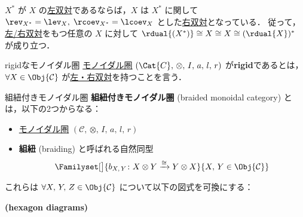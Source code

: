 \documentclass[TQFT_main]{subfiles}
\begin{document}
\begin{marker}
    $X^*$ が $X$ の\hyperref[def:dual]{左双対}であるならば，$X$ は $X^*$ に関して $\rev_{X^*} = \lev_{X},\; \rcoev_{X^*} = \lcoev_{X}$ とした\hyperref[def:dual]{右双対}となっている．
    従って，\hyperref[def:dual]{左/右双対}をもつ任意の $X$ に対して $\rdual{(X^*)} \cong X \cong X \cong (\rdual{X})^*$ が成り立つ．
\end{marker}

\begin{mydef}[label=redef:rigid]{rigidなモノイダル圏}
    \hyperref[def:monoidal-category]{モノイダル圏} $(\Cat{C},\, \otimes,\, I,\, a,\, l,\, r)$ が\textbf{rigid}であるとは，$\forall X \in \Obj{\mathcal{C}}$ が\hyperref[redef:dual]{左・右双対}を持つことを言う．
\end{mydef}


\begin{mydef}[label=redef:braided-monoidal]{組紐付きモノイダル圏}
    \textbf{組紐付きモノイダル圏} (braided monoidal category) とは，以下の2つからなる：
    \begin{itemize}
        \item \hyperref[redef:monoidal-category]{モノイダル圏} $(\mathcal{C},\, \otimes,\, I,\, a,\, l,\, r)$
        \item \textbf{組紐} (braiding) と呼ばれる自然同型
        \begin{align}
            \Familyset[\big]{b_{X,\, Y} \colon X \otimes Y \xrightarrow{\cong} Y \otimes X}{X,\, Y \in \Obj{\mathcal{C}}}
        \end{align}
    \end{itemize}
    これらは $\forall X,\, Y,\, Z \in \Obj{\mathcal{C}}$ について以下の図式を可換にする：
    \begin{description}
        \item[\textbf{(hexagon diagrams)}]　
        
        \begin{center}
        \end{center}
        

\end{description}
\end{mydef}
\end{document}
